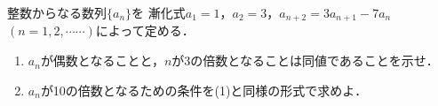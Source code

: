 \documentclass[../../main.tex]{subfiles}
\begin{document}
整数からなる数列$\{ a_n \}$を
漸化式$a_1=1$，$a_2=3$，$a_{n+2}=3a_{n+1}-7a_n$ $(n=1,2,\cdots\cdots)$によって定める．
\begin{enumerate}
  \item $a_n$が偶数となることと，$n$が3の倍数となることは同値であることを示せ．
  \item $a_n$が10の倍数となるための条件を(1)と同様の形式で求めよ．
\end{enumerate}
\end{document}
